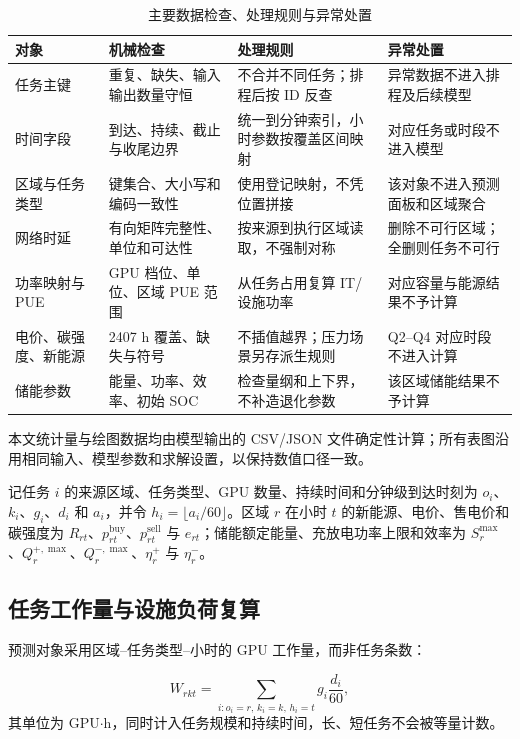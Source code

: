 \begin{table}[H]
  \centering
  \caption{主要数据检查、处理规则与异常处置}
  \label{tab:data-quality}
  \small
  \begin{tabularx}{\textwidth}{p{}p{}p{}X}
    \toprule
    对象 & 机械检查 & 处理规则 & 异常处置 \\
    \midrule
    任务主键 & 重复、缺失、输入输出数量守恒 & 不合并不同任务；排程后按 ID 反查 & 异常数据不进入排程及后续模型 \\
    时间字段 & 到达、持续、截止与收尾边界 & 统一到分钟索引，小时参数按覆盖区间映射 & 对应任务或时段不进入模型 \\
    区域与任务类型 & 键集合、大小写和编码一致性 & 使用登记映射，不凭位置拼接 & 该对象不进入预测面板和区域聚合 \\
    网络时延 & 有向矩阵完整性、单位和可达性 & 按来源到执行区域读取，不强制对称 & 删除不可行区域；全删则任务不可行 \\
    功率映射与 PUE & GPU 档位、单位、区域 PUE 范围 & 从任务占用复算 IT/设施功率 & 对应容量与能源结果不予计算 \\
    电价、碳强度、新能源 & 2407 h 覆盖、缺失与符号 & 不插值越界；压力场景另存派生规则 & Q2--Q4 对应时段不进入计算 \\
    储能参数 & 能量、功率、效率、初始 SOC & 检查量纲和上下界，不补造退化参数 & 该区域储能结果不予计算 \\
    \bottomrule
  \end{tabularx}
\end{table}

本文统计量与绘图数据均由模型输出的 CSV/JSON 文件确定性计算；所有表图沿用相同输入、模型参数和求解设置，以保持数值口径一致。

记任务 $i$ 的来源区域、任务类型、GPU 数量、持续时间和分钟级到达时刻为 $o_i$、$k_i$、$g_i$、$d_i$ 和 $a_i$，并令 $h_i=\lfloor a_i/60\rfloor$。区域 $r$ 在小时 $t$ 的新能源、电价、售电价和碳强度为 $R_{rt}$、$p^{\mathrm{buy}}_{rt}$、$p^{\mathrm{sell}}_{rt}$ 与 $e_{rt}$；储能额定能量、充放电功率上限和效率为 $S_r^{\max}$、$Q_r^{+,\max}$、$Q_r^{-,\max}$、$\eta_r^+$ 与 $\eta_r^-$。

\subsection{任务工作量与设施负荷复算}

预测对象采用区域--任务类型--小时的 GPU 工作量，而非任务条数：

\begin{equation}
  W_{rkt}=\sum_{i:o_i=r,\,k_i=k,\,h_i=t}g_i\frac{d_i}{60},
  \label{eq:workload}
\end{equation}
其单位为 GPU$\cdot$h，同时计入任务规模和持续时间，长、短任务不会被等量计数。

